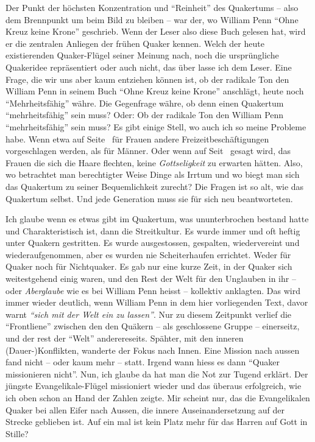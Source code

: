 Der Punkt der höchsten Konzentration und "`Reinheit"' des Quakertums -- also dem
Brennpunkt um beim Bild zu bleiben -- war der, wo William Penn "`Ohne Kreuz keine Krone"' geschrieb. Wenn der Leser also diese Buch gelesen hat, wird er die zentralen
Anliegen der frühen Quaker kennen. Welch der heute existierenden Quaker-Flügel
seiner Meinung nach, noch die ursprüngliche Quakeridee repräsentiert oder auch
nicht, das über lasse ich dem Leser. Eine Frage, die wir uns aber kaum entziehen
können ist, ob der radikale Ton den William Penn in seinem Buch "`Ohne Kreuz
keine Krone"' anschlägt, heute noch "`Mehrheitsfähig"' währe. Die Gegenfrage währe,
ob denn einen Quakertum "`mehrheitsfähig"' sein muss? Oder: Ob der radikale Ton den William Penn "`mehrheitsfähig"' sein muss?
Es gibt einige Stell, wo auch
ich so meine Probleme habe. Wenn etwa auf Seite~\pageref{kap15_ab5} für
Frauen andere Freizeitbeschäftigungen vorgeschlagen werden, als für Männer. Oder
wenn auf Seit~\pageref{ref:haarflechten} gesagt wird, das Frauen die sich die
Haare flechten, keine \textit{Gottseligkeit} zu erwarten hätten. Also, wo
betrachtet man berechtigter Weise Dinge als Irrtum und wo biegt man sich das
Quakertum zu seiner Bequemlichkeit zurecht? Die Fragen ist so alt, wie das
Quakertum selbst. Und jede Generation muss sie für sich neu beantworteten.

\medskip

Ich glaube wenn es etwas gibt im Quakertum, was ununterbrochen bestand hatte und
Charakteristisch ist, dann die Streitkultur. Es wurde immer und oft heftig unter
Quakern gestritten. Es wurde ausgestossen, gespalten, wiedervereint und
wiederaufgenommen, aber es wurden nie Scheiterhaufen errichtet. Weder für Quaker
noch für Nichtquaker. Es gab nur eine kurze Zeit, in der Quaker sich weitestgehend
einig waren, und den Rest der Welt für den Unglauben in ihr -- oder
\textit{Aberglaube} wie es bei William Penn heisst -- kollektiv anklagten. Das
wird immer wieder deutlich, wenn William Penn in dem hier vorliegenden Text, davor warnt \textit{"`sich mit
der Welt ein zu lassen"'}. Nur zu diesem Zeitpunkt verlief die "`Frontliene"' zwischen den den Quäkern -- als geschlossene Gruppe -- einerseitz, und der rest der "`Welt"' anderereseits. Spähter, mit den inneren (Dauer-)Konflikten, wanderte der Fokus
nach Innen. Eine Mission nach aussen fand nicht -- oder kaum mehr -- statt.
Irgend wann hiess es dann "`Quaker missionieren nicht"'. Nun, ich glaube da hat
man die Not zur Tugend erklärt. Der jüngste Evangelikale-Flügel missioniert
wieder und das überaus erfolgreich, wie ich oben schon an Hand der Zahlen zeigte. Mir scheint nur,
das die Evangelikalen Quaker bei allen Eifer nach Aussen, die innere
Auseinandersetzung auf der Strecke geblieben ist. Auf ein mal ist kein Platz mehr für das Harren auf Gott in Stille?

